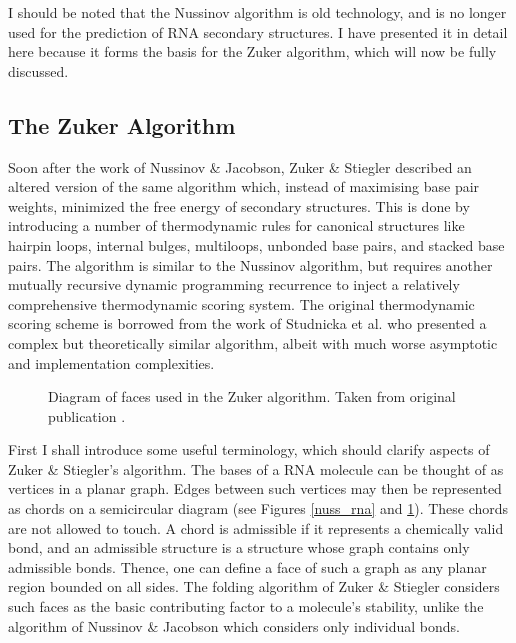 \documentclass{cshonours}
\begin{document}
I should be noted that the Nussinov algorithm is old technology, and is no longer used for the prediction of RNA secondary structures. I have presented it in detail here because it forms the basis for the Zuker algorithm, which will now be fully discussed.


\subsection{The Zuker Algorithm}

Soon after the work of Nussinov \& Jacobson, Zuker \& Stiegler \cite{zuker1981optimal}
described an altered version of the same algorithm which, instead of maximising
base pair weights, minimized the free energy of secondary structures. This is done
by introducing a number of thermodynamic rules for canonical structures like
hairpin loops, internal bulges, multiloops, unbonded base pairs, and stacked base
pairs. The algorithm is similar to the Nussinov algorithm, but requires another mutually recursive dynamic programming recurrence to inject
a relatively comprehensive thermodynamic scoring system. The original thermodynamic scoring scheme is borrowed from the work of Studnicka et al. \cite{studnicka1978computer} who presented a
complex but theoretically similar algorithm, albeit with
much worse asymptotic and implementation complexities. 


\begin{figure}
\begin{center}
\end{center}
\caption{Diagram of faces used in the Zuker algorithm. Taken from original
publication \cite{zuker1981optimal}.}
\label{zuk_struct}
\end{figure}

First I shall introduce some useful terminology, which should clarify aspects of Zuker \& Stiegler’s
algorithm. The bases of a RNA molecule can be thought of as vertices in a planar graph. Edges between such vertices may then be represented as chords on a semicircular diagram (see Figures \ref{nuss_rna} and \ref{zuk_struct}). These chords are not allowed to touch. A chord
is admissible if it represents a chemically valid bond, and an
admissible structure is a structure whose graph contains only admissible bonds.
Thence, one can define a face of such a graph as any planar region bounded on all
sides. The
folding algorithm of Zuker \& Stiegler considers such faces as the basic contributing factor to a molecule's stability, unlike the algorithm of Nussinov \& Jacobson
which considers only individual bonds.
\end{document}
